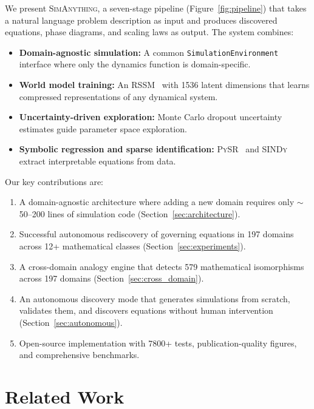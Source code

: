 \documentclass{article}
\newcommand{\ours}{\textsc{SimAnything}}
\newcommand{\pysr}{\textsc{PySR}}
\newcommand{\sindy}{\textsc{SINDy}}
\begin{document}
We present \ours{}, a seven-stage pipeline (Figure~\ref{fig:pipeline})
that takes a natural language problem description as input and produces
discovered equations, phase diagrams, and scaling laws as output. The system
combines:
\begin{itemize}
\item \textbf{Domain-agnostic simulation:} A common \texttt{SimulationEnvironment}
  interface where only the dynamics function is domain-specific.
\item \textbf{World model training:} An RSSM~\cite{hafner2020dreamerv2}
  with 1536 latent dimensions that learns compressed representations of
  any dynamical system.
\item \textbf{Uncertainty-driven exploration:} Monte Carlo dropout uncertainty
  estimates guide parameter space exploration.
\item \textbf{Symbolic regression and sparse identification:} \pysr{}~\cite{cranmer2023pysr}
  and \sindy{}~\cite{brunton2016sindy} extract interpretable equations
  from data.
\end{itemize}

Our key contributions are:
\begin{enumerate}
\item A domain-agnostic architecture where adding a new domain requires
  only $\sim$50--200 lines of simulation code (Section~\ref{sec:architecture}).
\item Successful autonomous rediscovery of governing equations in 197 domains
  across 12+ mathematical classes (Section~\ref{sec:experiments}).
\item A cross-domain analogy engine that detects 579 mathematical isomorphisms
  across 197 domains (Section~\ref{sec:cross_domain}).
\item An autonomous discovery mode that generates simulations from scratch,
  validates them, and discovers equations without human intervention
  (Section~\ref{sec:autonomous}).
\item Open-source implementation with 7800+ tests, publication-quality
  figures, and comprehensive benchmarks.
\end{enumerate}

\section{Related Work}
\label{sec:related}
\end{document}
